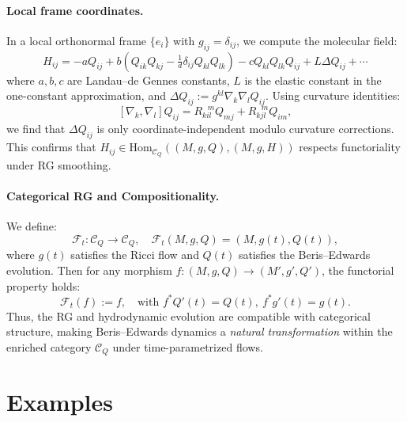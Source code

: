 	\paragraph{Local frame coordinates.}  
	In a local orthonormal frame \( \{ e_i \} \) with \( g_{ij} = \delta_{ij} \), we compute the molecular field:
	\[
	H_{ij} = -a Q_{ij} + b(Q_{ik} Q_{kj} - \tfrac{1}{d} \delta_{ij} Q_{kl} Q_{lk}) - c Q_{kl} Q_{lk} Q_{ij} + L \Delta Q_{ij} + \cdots
	\]
	where \( a, b, c \) are Landau–de Gennes constants, \( L \) is the elastic constant in the one-constant approximation, and \( \Delta Q_{ij} := g^{kl} \nabla_k \nabla_l Q_{ij} \). Using curvature identities:
	\[
	[\nabla_k, \nabla_l] Q_{ij} = R_{kil}^{\ \ \ m} Q_{mj} + R_{kjl}^{\ \ \ m} Q_{im},
	\]
	we find that \( \Delta Q_{ij} \) is only coordinate-independent modulo curvature corrections. This confirms that \( H_{ij} \in \mathrm{Hom}_{\mathcal{C}_Q}((M,g,Q), (M,g,H)) \) respects functoriality under RG smoothing.
	
	\paragraph{Categorical RG and Compositionality.}  
	We define:
	\[
	\mathcal{F}_t: \mathcal{C}_Q \to \mathcal{C}_Q, \quad \mathcal{F}_t(M, g, Q) = (M, g(t), Q(t)),
	\]
	where \( g(t) \) satisfies the Ricci flow and \( Q(t) \) satisfies the Beris–Edwards evolution. Then for any morphism \( f: (M,g,Q) \to (M',g',Q') \), the functorial property holds:
	\[
	\mathcal{F}_t(f) := f, \quad \text{with } f^* Q'(t) = Q(t), \ f^* g'(t) = g(t).
	\]
	Thus, the RG and hydrodynamic evolution are compatible with categorical structure, making Beris–Edwards dynamics a \emph{natural transformation} within the enriched category \( \mathcal{C}_Q \) under time-parametrized flows.
	
\section{Examples}
	
